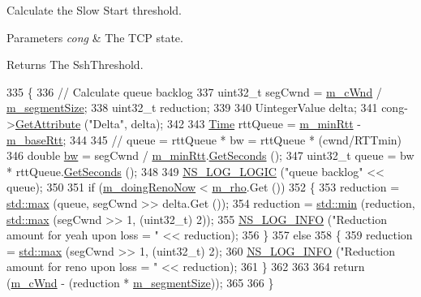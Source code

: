 Calculate the Slow Start threshold. 


\begin{DoxyParams}{Parameters}
{\em cong} & The T\+CP state. \\
\hline
\end{DoxyParams}
\begin{DoxyReturn}{Returns}
The Ssh\+Threshold. 
\end{DoxyReturn}

\begin{DoxyCode}
335 \{
336   \textcolor{comment}{// Calculate queue backlog}
337   uint32\_t segCwnd = \hyperlink{classTcpYeahDecrementTest_a51e21a89b0f5fcab90370db699a214e5}{m\_cWnd} / \hyperlink{classTcpYeahDecrementTest_a9d6ce4cfe2bb3251f248baa0f44c8cb2}{m\_segmentSize};
338   uint32\_t reduction;
339 
340   UintegerValue delta;
341   cong->\hyperlink{classns3_1_1ObjectBase_a895d1de2f96063d0e0fd78463e7a7e30}{GetAttribute} (\textcolor{stringliteral}{"Delta"}, delta);
342 
343   \hyperlink{classns3_1_1Time}{Time} rttQueue =  \hyperlink{classTcpYeahDecrementTest_a728d66615946db9e33dc926a6487a998}{m\_minRtt} - \hyperlink{classTcpYeahDecrementTest_a3086a8d8bda85c67c56b15b29d966334}{m\_baseRtt};
344 
345   \textcolor{comment}{// queue = rttQueue * bw = rttQueue * (cwnd/RTTmin)}
346   \textcolor{keywordtype}{double} \hyperlink{generate__test__data__lte__spectrum__model_8m_a3f7228a3941f19f282647a09dd494528}{bw} = segCwnd / \hyperlink{classTcpYeahDecrementTest_a728d66615946db9e33dc926a6487a998}{m\_minRtt}.\hyperlink{classns3_1_1Time_a8f20d5c3b0902d7b4320982f340b57c8}{GetSeconds} ();
347   uint32\_t queue = bw * rttQueue.\hyperlink{classns3_1_1Time_a8f20d5c3b0902d7b4320982f340b57c8}{GetSeconds} ();
348 
349   \hyperlink{group__logging_ga88acd260151caf2db9c0fc84997f45ce}{NS\_LOG\_LOGIC} (\textcolor{stringliteral}{"queue backlog"} << queue);
350 
351   \textcolor{keywordflow}{if} (\hyperlink{classTcpYeahDecrementTest_ab8a89641d509b1895ffc3b4f24ef0573}{m\_doingRenoNow} < \hyperlink{classTcpYeahDecrementTest_ad98d7965f6f41d7ab3d8d00f5edcf90a}{m\_rho}.Get ())
352     \{
353       reduction = \hyperlink{80211b_8c_affe776513b24d84b39af8ab0930fef7f}{std::max} (queue, segCwnd >> delta.Get ());
354       reduction = \hyperlink{80211b_8c_ac6afabdc09a49a433ee19d8a9486056d}{std::min} (reduction, \hyperlink{80211b_8c_affe776513b24d84b39af8ab0930fef7f}{std::max} (segCwnd >> 1, (uint32\_t) 2));
355       \hyperlink{group__logging_gafbd73ee2cf9f26b319f49086d8e860fb}{NS\_LOG\_INFO} (\textcolor{stringliteral}{"Reduction amount for yeah upon loss = "} << reduction);
356     \}
357   \textcolor{keywordflow}{else}
358     \{
359       reduction = \hyperlink{80211b_8c_affe776513b24d84b39af8ab0930fef7f}{std::max} (segCwnd >> 1, (uint32\_t) 2);
360       \hyperlink{group__logging_gafbd73ee2cf9f26b319f49086d8e860fb}{NS\_LOG\_INFO} (\textcolor{stringliteral}{"Reduction amount for reno upon loss = "} << reduction);
361     \}
362 
363 
364   \textcolor{keywordflow}{return} (\hyperlink{classTcpYeahDecrementTest_a51e21a89b0f5fcab90370db699a214e5}{m\_cWnd} - (reduction * \hyperlink{classTcpYeahDecrementTest_a9d6ce4cfe2bb3251f248baa0f44c8cb2}{m\_segmentSize}));
365 
366 \}
\end{DoxyCode}



